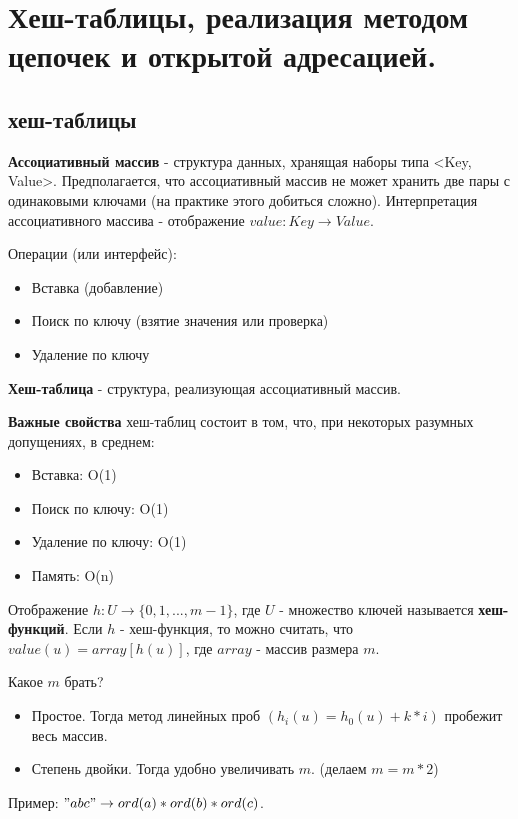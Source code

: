 \section{Хеш-таблицы, реализация методом цепочек и открытой адресацией.}

\subsection*{хеш-таблицы}

{\bf Ассоциативный массив} - структура данных, хранящая наборы типа <Key, Value>. 
Предполагается, что ассоциативный массив не может хранить две пары с одинаковыми ключами (на практике этого добиться сложно).
Интерпретация ассоциативного массива - отображение $value: Key \rightarrow Value$.

Операции (или интерфейс):
\begin{itemize}
\item Вставка (добавление)
\item Поиск по ключу (взятие значения или проверка)
\item Удаление по ключу
\end{itemize}

{\bf Хеш-таблица} - структура, реализующая ассоциативный массив.

{\bf Важные свойства} хеш-таблиц состоит в том, что, при некоторых разумных допущениях, в среднем:
\begin{itemize}
\item Вставка: O(1)
\item Поиск по ключу: O(1)
\item Удаление по ключу: O(1)
\item Память: O(n)
\end{itemize}

Отображение $h: U \rightarrow \{0, 1, ..., m-1\}$, где $U$ - множество ключей называется {\bf хеш-функций}.
Если $h$ - хеш-функция, то можно считать, что $value(u) = array[h(u)]$, где $array$ - массив размера $m$.

Какое $m$ брать?
\begin{itemize}
\item Простое. Тогда метод линейных проб $(h_i(u) = h_0(u) + k*i)$ пробежит весь массив.
\item Степень двойки. Тогда удобно увеличивать $m$. (делаем $m = m*2$)
\end{itemize}

Пример:
$"abc" \rightarrow ord(a)*ord(b)*ord(c)$.

